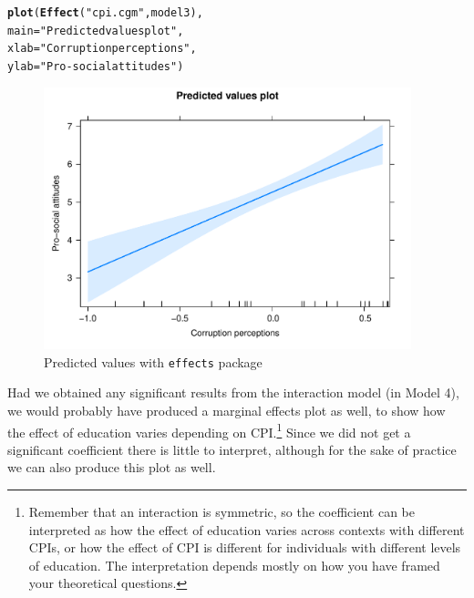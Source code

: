 \documentclass[12pt,english]{article}\usepackage[]{graphicx}\usepackage[usenames, dvipsnames]{xcolor}
\makeatletter
\newcommand{\hlstr}[1]{\textcolor[rgb]{0.192,0.494,0.8}{#1}}%
\newcommand{\hlstd}[1]{\textcolor[rgb]{0.345,0.345,0.345}{#1}}%
\newcommand{\hlkwc}[1]{\textcolor[rgb]{0.333,0.667,0.333}{#1}}%
\newcommand{\hlkwd}[1]{\textcolor[rgb]{0.737,0.353,0.396}{\textbf{#1}}}%
\newenvironment{kframe}{%
 \def\at@end@of@kframe{}%
 \ifinner\ifhmode%
  \def\at@end@of@kframe{\end{minipage}}%
  \begin{minipage}{\columnwidth}%
 \fi\fi%
 \def\FrameCommand##1{\hskip\@totalleftmargin \hskip-\fboxsep
 \colorbox{shadecolor}{##1}\hskip-\fboxsep
     \hskip-\linewidth \hskip-\@totalleftmargin \hskip\columnwidth}%
 \MakeFramed {\advance\hsize-\width
   \@totalleftmargin\z@ \linewidth\hsize
   \@setminipage}}%
 {\par\unskip\endMakeFramed%
 \at@end@of@kframe}
\newenvironment{knitrout}{}{} %
\makeatother
\begin{document}
\begin{knitrout}
\color{fgcolor}\begin{kframe}
\begin{alltt}
\hlkwd{plot}\hlstd{(}\hlkwd{Effect}\hlstd{(}\hlstr{"cpi.cgm"}\hlstd{, model3),}
     \hlkwc{main} \hlstd{=} \hlstr{"Predicted values plot"}\hlstd{,}
     \hlkwc{xlab} \hlstd{=} \hlstr{"Corruption perceptions"}\hlstd{,}
     \hlkwc{ylab} \hlstd{=} \hlstr{"Pro-social attitudes"}\hlstd{)}
\end{alltt}
\end{kframe}
\end{knitrout}



\begin{figure}[!ht]
  \centering
  \includegraphics[width=0.95\textwidth]{../../05-graphs/Supplem-05.pdf}
  \caption{Predicted values with \texttt{effects} package}
  \label{fig:fig-03}
\end{figure}

Had we obtained any significant results from the interaction model (in Model 4), we would probably have produced a marginal effects plot as well, to show how the effect of education varies depending on CPI.\footnote{Remember that an interaction is symmetric, so the coefficient can be interpreted as how the effect of education varies across contexts with different CPIs, or how the effect of CPI is different for individuals with different levels of education. The interpretation depends mostly on how you have framed your theoretical questions.} Since we did not get a significant coefficient there is little to interpret, although for the sake of practice we can also produce this plot as well.
\end{document}
